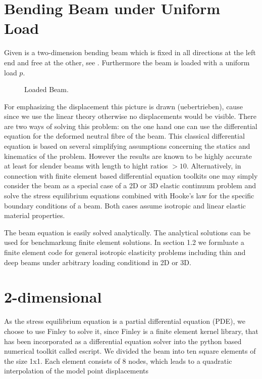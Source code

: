 \section{Bending Beam under Uniform Load}
\label{BEAM CHAP}

Given is a two-dimension bending beam which is fixed in all directions
at the left end and free at the other, see . Furthermore the beam is loaded
with a uniform load $p$.

\begin{figure}
\caption{Loaded Beam.}
\label{BEAM FIG 1}
\end{figure}



For emphasizing the displacement this picture is drawn (uebertrieben),
cause since we use the linear theory otherwise no displacements would
be visible. 
There are two ways of solving this problem: on the one hand one can
use the differential equation for the deformed neutral fibre of the
beam. This classical differential equation is based on several simplifying
assumptions concerning the statics and kinematics of the problem.
However the results are known to be highly accurate at least for slender
beams with length to hight ratios $> 10$. Alternatively, in connection
with finite element based differential equation toolkits one may simply
consider the beam as a special case of a 2D or 3D elastic continuum
problem and solve the stress equilibrium equations combined with Hooke's
law for the specific boundary conditions of a beam. Both cases assume
isotropic and linear elastic material properties.

The beam equation is easily solved analytically. The analytical solutions
can be used for benchmarkung finite element solutions. In section
1.2 we formluate a finite element code for general isotropic elasticity
problems including thin and deep beams under arbitrary loading conditiond
in 2D or 3D. 


\section{2-dimensional}
As the stress equilibrium equation is a partial differential equation
(PDE), we choose to use Finley to solve it, since Finley is a finite
element kernel library, that has been incorporated as a differential
equation solver into the python based numerical toolkit called escript.
We divided the beam into ten square elements of the size 1x1. Each
element consists of 8 nodes, which leads to a quadratic interpolation
of the model point displacements \\

